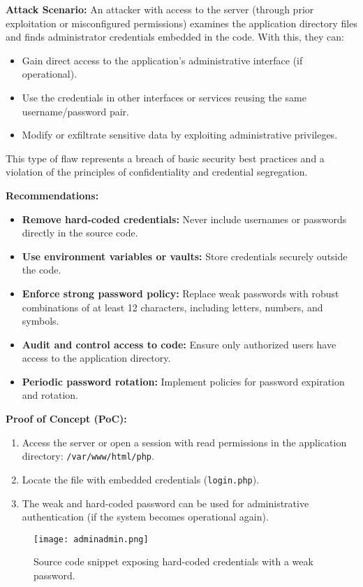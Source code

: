 \documentclass[a4paper,12pt]{article}
\begin{document}
\textbf{Attack Scenario:}  
An attacker with access to the server (through prior exploitation or misconfigured permissions) examines the application directory files and finds administrator credentials embedded in the code. With this, they can:
\begin{itemize}
    \item Gain direct access to the application’s administrative interface (if operational).
    \item Use the credentials in other interfaces or services reusing the same username/password pair.
    \item Modify or exfiltrate sensitive data by exploiting administrative privileges.
\end{itemize}
This type of flaw represents a breach of basic security best practices and a violation of the principles of confidentiality and credential segregation.

\textbf{Recommendations:}  
\begin{itemize}
    \item \textbf{Remove hard-coded credentials:} Never include usernames or passwords directly in the source code.
    \item \textbf{Use environment variables or vaults:} Store credentials securely outside the code.
    \item \textbf{Enforce strong password policy:} Replace weak passwords with robust combinations of at least 12 characters, including letters, numbers, and symbols.
    \item \textbf{Audit and control access to code:} Ensure only authorized users have access to the application directory.
    \item \textbf{Periodic password rotation:} Implement policies for password expiration and rotation.
\end{itemize}

\textbf{Proof of Concept (PoC):}  
\begin{enumerate}
    \item Access the server or open a session with read permissions in the application directory: \texttt{/var/www/html/php}.
    \item Locate the file with embedded credentials (\texttt{login.php}).
    \item The weak and hard-coded password can be used for administrative authentication (if the system becomes operational again).
\end{enumerate}

\begin{figure}[H]
    \centering
    \texttt{[image: adminadmin.png]}
    \caption{Source code snippet exposing hard-coded credentials with a weak password.}
\end{figure}
\end{document}
